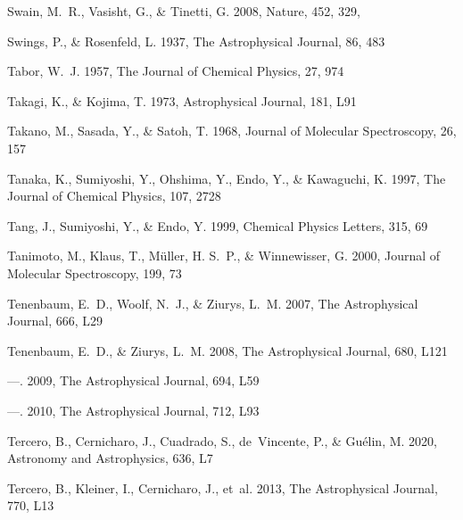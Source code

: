 \documentclass[twocolumn]{aastex631}
\begin{document}
\begin{thebibliography}{}
{Swain}, M.~R., {Vasisht}, G., \& {Tinetti}, G. 2008, Nature, 452, 329,

Swings, P., \& Rosenfeld, L. 1937, The Astrophysical Journal, 86, 483

Tabor, W.~J. 1957, The Journal of Chemical Physics, 27, 974

Takagi, K., \& Kojima, T. 1973, Astrophysical Journal, 181, L91

Takano, M., Sasada, Y., \& Satoh, T. 1968, Journal of Molecular Spectroscopy,
  26, 157

Tanaka, K., Sumiyoshi, Y., Ohshima, Y., Endo, Y., \& Kawaguchi, K. 1997, The
  Journal of Chemical Physics, 107, 2728

Tang, J., Sumiyoshi, Y., \& Endo, Y. 1999, Chemical Physics Letters, 315, 69

Tanimoto, M., Klaus, T., M{\"u}ller, H. S.~P., \& Winnewisser, G. 2000, Journal
  of Molecular Spectroscopy, 199, 73

Tenenbaum, E.~D., Woolf, N.~J., \& Ziurys, L.~M. 2007, The Astrophysical
  Journal, 666, L29

Tenenbaum, E.~D., \& Ziurys, L.~M. 2008, The Astrophysical Journal, 680, L121

---. 2009, The Astrophysical Journal, 694, L59

---. 2010, The Astrophysical Journal, 712, L93

Tercero, B., Cernicharo, J., Cuadrado, S., de~Vincente, P., \& Gu{\'e}lin, M.
  2020, Astronomy and Astrophysics, 636, L7

Tercero, B., Kleiner, I., Cernicharo, J., {et~al.} 2013, The Astrophysical
  Journal, 770, L13


\end{thebibliography}
\end{document}

